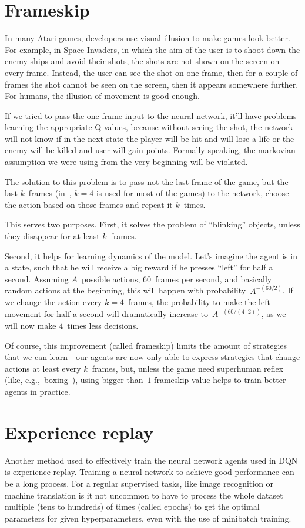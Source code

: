 \section{Frameskip}\label{dqn-frameskip}
In many Atari games, developers use visual illusion to make games look better. For example, in Space Invaders, in which the aim of the user is to shoot down the enemy ships and avoid their shots, the shots are not shown on the screen on every frame. Instead, the user can see the shot on one frame, then for a couple of frames the shot cannot be seen on the screen, then it appears somewhere further. For humans, the illusion of movement is good enough.

If we tried to pass the one-frame input to the neural network, it'll have problems learning the appropriate Q-values, because without seeing the shot, the network will not know if in the next state the player will be hit and will lose a life or the enemy will be killed and user will gain points. Formally speaking, the markovian assumption we were using from the very beginning will be violated.

The solution to this problem is to pass not the last frame of the game, but the last $k$~frames (in~\cite{nips-dqn}, $k=4$ is used for most of the games) to the network, choose the action based on those frames and repeat it $k$~times.

This serves two purposes. First, it solves the problem of ``blinking'' objects, unless they disappear for at least $k$~frames.

Second, it helps for learning dynamics of the model. Let's imagine the agent is in a state, such that he will receive a big reward if he presses ``left'' for half a second. Assuming $A$~possible actions, $60$~frames per second, and basically random actions at the beginning, this will happen with probability~$A^{-(60 / 2)}$. If we change the action every $k=4$~frames, the probability to make the left movement for half a second will dramatically increase to~$A^{-(60/(4 \cdot 2))}$, as we will now make $4$~times less decisions.

Of course, this improvement (called frameskip) limits the amount of strategies that we can learn---our agents are now only able to express strategies that change actions at least every $k$~frames, but, unless the game need superhuman reflex (like, e.g.,~boxing~\cite{boxing}), using bigger than~$1$ frameskip value helps to train better agents in practice.

\section{Experience replay}\label{experience-replay}
Another method used to effectively train the neural network agents used in DQN is experience replay. Training a neural network to achieve good performance can be a long process. For a regular supervised tasks, like image recognition or machine translation is it not uncommon to have to process the whole dataset multiple (tens to hundreds) of times (called epochs) to get the optimal parameters for given hyperparameters, even with the use of minibatch training.

